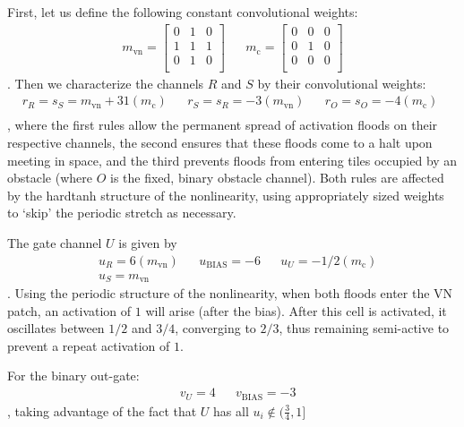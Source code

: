 \documentclass{article}
\begin{document}
First, let us define the following constant convolutional weights:
\begin{align*}
	m_{\text{vn}} = \begin{bmatrix}
		0 & 1 & 0 \\
		1 & 1 & 1 \\
		0 & 1 & 0 \\
	\end{bmatrix} &&
	m_\text{c} = \begin{bmatrix}
		0 & 0 & 0 \\
		0 & 1 & 0 \\
		0 & 0 & 0 \\
\end{bmatrix}
\end{align*}
. Then we characterize the channels $R$ and $S$ by their convolutional weights:
\begin{align*}
&r_{R} = s_{S} = m_\text{vn} + 31(m_\text{c})&&
	r_{S} = s_{R} = -3 (m_\text{vn}) &&
	r_{O} = s_{O} = -4 (m_\text{c}) && \\
\end{align*}
, where the first rules allow the permanent spread of activation floods on their respective channels, the second ensures that these floods come to a halt upon meeting in space, and the third prevents floods from entering tiles occupied by an obstacle (where $O$ is the fixed, binary obstacle channel). Both rules are affected by the hardtanh structure of the nonlinearity, using appropriately sized weights to `skip' the periodic stretch as necessary.

The gate channel $U$ is given by 
\begin{align*}
	&	u_R = 6(m_\text{vn}) &&u_\text{BIAS}=-6 &&u_U = -1/2(m_\text{c}) \\
	& u_S = m_\text{vn}
\end{align*}
. Using the periodic structure of the nonlinearity, when both floods enter the VN patch, an activation of $1$ will arise (after the bias).
After this cell is activated, it oscillates between $1/2$ and $3/4$, converging to $2/3$, thus remaining semi-active to prevent a repeat activation of $1$. 

For the binary out-gate:
\begin{align*}
	& v_U = 4 && v_\text{BIAS} = -3
\end{align*}
, taking advantage of the fact that $U$ has all $u_i \not\in (\frac{3}{4}, 1]$
\end{document}
